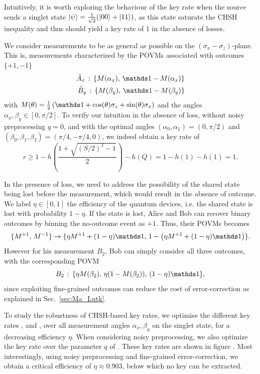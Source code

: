 \medbreak

Intuitively, it is worth exploring the behaviour of the key rate when the source sends a singlet state $\ket{\psi}=\frac{1}{\sqrt{2}}(\ket{00}+\ket{11})$, as this state saturate the CHSH inequality and thus should yield a key rate of $1$ in the absence of losses.

We consider measurements to be as general as possible on the $(\sigma_x-\sigma_z)$-plane. This is, measurements characterized by the POVMs associated with outcomes $\{+1,-1\}$
\begin{equation}
	\begin{split}
		\hat{A}_x\,:\, \{M(\alpha_x),\, \id-M(\alpha_x)\} \\
		\hat{B}_y\,:\, \{M(\beta_y),\, \id-M(\beta_y)\}
	\end{split}	
\end{equation}
with $M(\theta) = \frac{1}{2}\left(\id + \cos(\theta)\sigma_z + \sin(\theta)\sigma_x \right)$ and the angles $\alpha_x,\beta_y\in[0,\pi/2]$.
To verify our intuition in the absence of loss, without noisy preprocessing $q=0$, and with the optimal angles $(\alpha_0,\alpha_1)=(0,\pi/2)$ and $(\beta_0,\beta_1,\beta_2)=(\pi/4,-\pi/4,0)$, we indeed obtain a key rate of
\begin{equation}
	r \geq 1-h\left(\frac{1+\sqrt{(S/2)^2-1}}{2}\right)-h(Q) = 1 - h(1) - h(1) = 1.
\end{equation}

In the presence of loss, we need to address the possibility of the shared state being lost before the measurement, which would result in the absence of outcome.
We label $\eta\in[0,1]$ the efficiency of the quantum devices, i.e. the shared state is lost with probability $1-\eta$.
If the state is lost, Alice and Bob can recover binary outcomes by binning the no-outcome event as $+1$.
Thus, their POVMs becomes
\begin{equation}
	\{M^{+1},\,M^{-1}\} \rightarrow \{\eta M^{+1}+(1-\eta) \id,\, 1-\left(\eta M^{+1}+(1-\eta) \id\right)\}.
\end{equation}
However for his measurement $B_2$, Bob can simply consider all three outcomes, with the corresponding POVM
\begin{equation}
	B_2\, : \, \{\eta M(\beta_2),\, \eta (1-M(\beta_2)),\, (1-\eta) \id \},
\end{equation}
since exploiting fine-grained outcomes can reduce the cost of error-correction as explained in Sec.~\ref{sec:Ma_Lutk}.

To study the robustness of CHSH-based key rates, we optimise the different key rates ,  and , over all measurement angles $\alpha_x,\beta_y$ on the singlet state, for a decreasing efficiency $\eta$. 
When considering noisy preprocessing, we also optimize the key rate over the parameter $q$ of .
These key rates are shown in figure . 
Most interestingly, using noisy preprocessing and fine-grained error-correction, we obtain a critical efficiency of $\eta \approx 0.903$, below which no key can be extracted.

